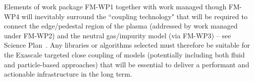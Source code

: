 Elements of work package FM-WP1 together with work managed though FM-WP4 will 
inevitably surround the ``coupling technology" that will be required to 
connect the edge/pedestal region of the plasma (addressed by work managed under 
FM-WP2) and the neutral gas/impurity model (via FM-WP3) -- see Science Plan~\cite{sciplan}. 
Any libraries or algorithms selected must therefore be suitable for the 
Exascale targeted close coupling of models (potentially including both fluid 
and particle-based approaches) that will be essential to deliver a performant 
and actionable infrastructure in the long term.

